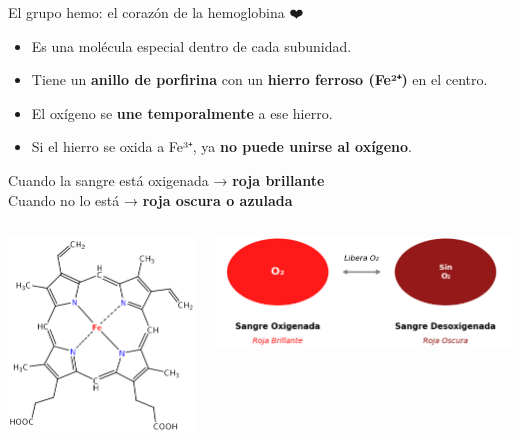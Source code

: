 \documentclass[
  ignorenonframetext,
]{beamer}
\providecommand{\tightlist}{%
  \setlength{\itemsep}{0pt}\setlength{\parskip}{0pt}}
\begin{document}
\begin{frame}{El grupo hemo: el corazón de la hemoglobina ❤️}
\label{el-grupo-hemo-el-corazuxf3n-de-la-hemoglobina}
\begin{itemize}
\tightlist
\item
  Es una molécula especial dentro de cada subunidad.\\
\item
  Tiene un \textbf{anillo de porfirina} con un \textbf{hierro ferroso
  (Fe²⁺)} en el centro.\\
\item
  El oxígeno se \textbf{une temporalmente} a ese hierro.\\
\item
  Si el hierro se oxida a Fe³⁺, ya \textbf{no puede unirse al oxígeno}.
\end{itemize}

Cuando la sangre está oxigenada → \textbf{roja brillante}\\
Cuando no lo está → \textbf{roja oscura o azulada}

\begin{columns}[T]
\begin{column}{0.5\linewidth}
\includegraphics[width=0.65\linewidth,height=\textheight,keepaspectratio]{grupo.png}
\end{column}

\begin{column}{0.5\linewidth}
\includegraphics[width=0.6\linewidth,height=\textheight,keepaspectratio]{oxigenada.png}
\end{column}
\end{columns}
\end{frame}
\end{document}
